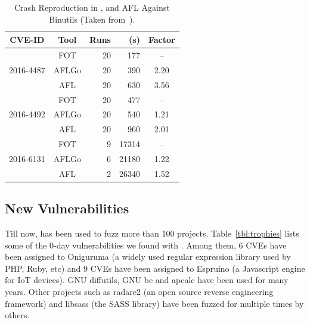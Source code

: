 \begin{table}[!t]
	\small
	\centering
	\caption{Crash Reproduction in {\dFOT}, {\aflgo} and AFL Against Binutils (Taken from~\cite{hawkeye}).}
	\label{tbl:cr_aflgo_binutils}
	\vspace{-10pt}
	\begin{tabular}{|c|c|r|r|c|}
		\hline
		\textbf{CVE-ID}   & \textbf{Tool}  & \textbf{Runs} & \utte (s)  & \textbf{Factor} \\ \hline\hline
		\multirow{3}{*}{2016-4487}& FOT &   20    &   177   & -- \\ \cline{2-5} 
		& AFLGo  &  20  & 390 & 2.20\\ \cline{2-5} 
		&  AFL   &   20 & 630  &   3.56  \\ \hline
\multirow{3}{*}{2016-4492} & FOT &     20      &                    477                                 &       --      \\ \cline{2-5} 
		&   AFLGo  &     20   &  540  &                 1.21                                               \\ \cline{2-5} 
		&    AFL   &     20   &                         960                            &                  2.01                                              \\ \hline
		\multirow{3}{*}{2016-6131} & FOT &       9     &                     17314                                &                      --                                          \\ \cline{2-5} 
		&   AFLGo  &                   6                                   &                      21180                               &                                1.22                                \\ \cline{2-5} 
		& AFL   &                    2                                  &            26340                                         &             1.52                                                   \\ \hline
		
	\end{tabular}
\end{table} 



%
 \subsection{New Vulnerabilities}



Till now, {\FOT} has been used to fuzz more than 100 projects.
Table~\ref{tbl:trophies} lists some of the 0-day vulnerabilities we found with {\FOT}. Among them, 6 CVEs have been assigned to Oniguruma (a widely used regular expression library used by PHP, Ruby, etc) and 9 CVEs have been assigned to Espruino (a Javascript engine for IoT devices). GNU diffutils, GNU bc and apcalc have been used for many years. Other projects such as radare2 (an open source reverse engineering framework) and libsass (the SASS library) have been fuzzed for multiple times by others.

